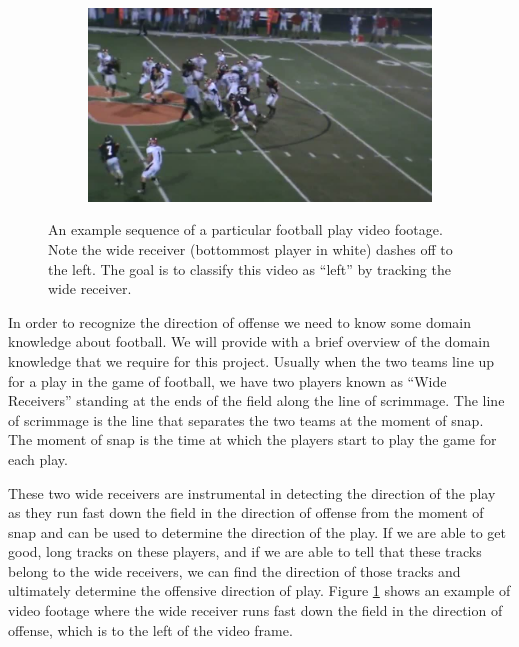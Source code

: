 \documentclass{article} %
\begin{document}
{\begin{figure}
\begin{subfigure}{.24\textwidth}
 \end{subfigure}\hspace{.5em}%
 \begin{subfigure}{.24\textwidth}
  \centering
  \includegraphics[width=1\linewidth]{img/football_frame4.jpg}
 \end{subfigure}
\caption{An example sequence of a particular football play video footage. Note the wide receiver (bottommost player in white) dashes off to the left. The goal is to classify this video as ``left'' by tracking the wide receiver.}
\label{fig:football}
\end{figure}
}

In order to recognize the direction of offense we need to know some domain knowledge about football. We will provide with a brief overview of the domain knowledge that we require for this project. Usually when the two teams line up for a play in the game of football, we have two players known as ``Wide Receivers'' standing at the ends of the field along the line of scrimmage. The line of scrimmage is the line that separates the two teams at the moment of snap. The moment of snap is the time at which the players start to play the game for each play. 

These two wide receivers are instrumental in detecting the direction of the play as they run fast down the field in the direction of offense from the moment of snap and can be used to determine the direction of the play. If we are able to get good, long tracks on these players, and if we are able to tell that these tracks belong to the wide receivers, we can find the direction of those tracks and ultimately determine the offensive direction of play. Figure \ref{fig:football} shows an example of video footage where the wide receiver runs fast down the field in the direction of offense, which is to the left of the video frame.
\end{document}
